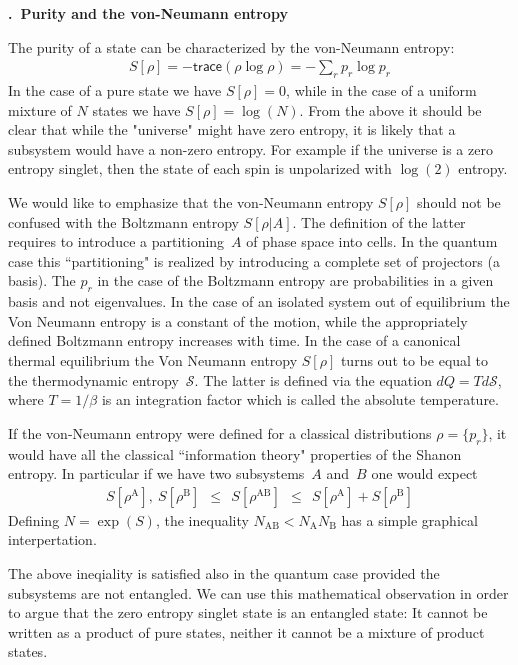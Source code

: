 \documentclass[onecolumn,fleqn, 11pt]{revtex4}
\newcommand{\trc}{\mathsf{trace}}
\newcommand{\tbox}[1]{\text{#1}}
\newcommand{\beq}{\begin{eqnarray}}
\newcommand{\eeq}{\end{eqnarray}}
\renewcommand{\thesubsection}{\arabic{subsection}}
\renewcommand{\thesubsubsection}{\arabic{subsubsection}}
\newcommand{\sheadC}[1]
{
\addtocounter{subsubsection}{1}
\vspace{5mm}
{\bf \thesubsection.\thesubsubsection \ #1}  
\nopagebreak
\phantomsection
}
\begin{document}
\sheadC{Purity and the von-Neumann entropy}


The purity of a state can be characterized 
by the von-Neumann entropy:  
\beq
S[\rho] = -\trc(\rho\log\rho)  = -\sum_{r} p_{r} \log{p_{r}} 
\eeq
In the case of a pure state we have $S[\rho]=0$, 
while in the case of a uniform mixture of $N$ states we have $S[\rho]=\log(N)$.  
From the above it should be clear that while the "universe" 
might have zero entropy, it is likely that a subsystem  
would have a non-zero entropy. For example if the universe 
is a zero entropy singlet, then the state of each spin 
is unpolarized with $\log(2)$ entropy. 

We would like to emphasize that the von-Neumann entropy $S[\rho]$ 
should not be confused with the Boltzmann entropy $S[\rho|A]$. 
The definition of the latter requires to introduce 
a partitioning~$A$ of phase space into cells.  
In the quantum case this ``partitioning"  is realized 
by introducing a complete set of projectors (a basis).  
The $p_r$ in the case of the Boltzmann entropy 
are probabilities in a given basis and not eigenvalues.
In the case of an isolated system out of equilibrium 
the Von Neumann entropy is a constant of the motion, 
while the appropriately defined Boltzmann entropy increases with time. 
In the case of a canonical thermal equilibrium  
the Von Neumann entropy $S[\rho]$ turns out to be equal 
to the thermodynamic entropy~$\mathcal{S}$. 
The latter is defined via the equation $dQ=Td\mathcal{S}$, 
where $T=1/\beta$ is an integration factor 
which is called the absolute temperature.

If the von-Neumann entropy were defined for a classical 
distributions ${\rho=\{p_r\}}$, it would have all the 
classical ``information theory" properties of the Shanon entropy.
In particular if we have two subsystems~$A$ and~$B$ one 
would expect 
\beq
S[\rho^{\tbox{A}}], \ S[\rho^{\tbox{B}}] 
\ \ \le \ \ 
S[\rho^{\tbox{AB}}]
\ \ \le \ \ 
S[\rho^{\tbox{A}}]+S[\rho^{\tbox{B}}]
\eeq 
Defining $N=\exp(S)$, the inequality ${N_{\tbox{AB}}<N_{\tbox{A}}N_{\tbox{B}}}$ 
has a simple graphical interpertation. 



The above ineqiality is satisfied also in the  
quantum case provided the subsystems are not entangled. 
We can use this mathematical observation in order 
to argue that the zero entropy singlet state 
is an entangled state: It cannot be written as a product 
of pure states, neither it cannot be a mixture of product states. 
\end{document}
